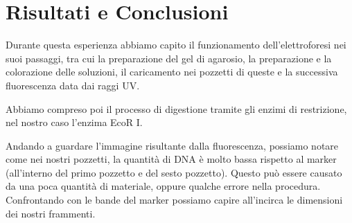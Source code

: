 \section{Risultati e Conclusioni}

Durante questa esperienza abbiamo capito il funzionamento dell'elettroforesi nei suoi passaggi,
tra cui la preparazione del gel di agarosio, la preparazione e la colorazione delle soluzioni,
il caricamento nei pozzetti di queste e la successiva fluorescenza data dai raggi UV.

Abbiamo compreso poi il processo di digestione tramite gli enzimi di restrizione,
nel nostro caso l'enzima EcoR I.

Andando a guardare l'immagine risultante dalla fluorescenza,
possiamo notare come nei nostri pozzetti,
la quantità di DNA è molto bassa rispetto al
marker (all'interno del primo pozzetto e del sesto pozzetto).
Questo può essere causato da una poca quantità di materiale, oppure qualche errore nella procedura.
Confrontando con le bande del marker possiamo capire all'incirca le dimensioni dei nostri frammenti.
